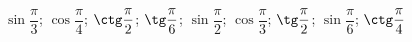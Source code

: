 \begin{ex}[type=calculate]
	\begin{condition}
		\( \sin\dfrac{\pi}{3} \); \( \cos\dfrac{\pi}{4} \); \( \ctg\dfrac{\pi}{2} \); \( \tg\dfrac{\pi}{6} \); \( \sin\dfrac{\pi}{2} \); \( \cos\dfrac{\pi}{3} \); \( \tg\dfrac{\pi}{2} \); \( \sin\dfrac{\pi}{6} \); \( \ctg\dfrac{\pi}{4} \)
	\end{condition}
\end{ex}